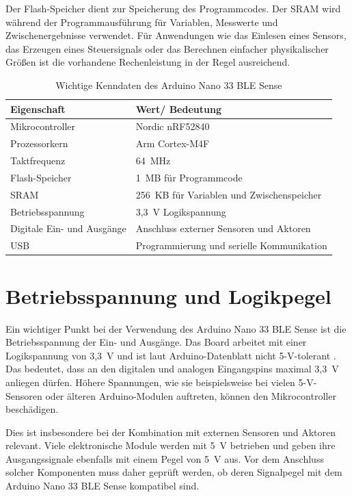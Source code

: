 Der Flash-Speicher dient zur Speicherung des Programmcodes. Der SRAM wird während der Programmausführung für Variablen, Messwerte und Zwischenergebnisse verwendet. Für Anwendungen wie das Einlesen eines Sensors, das Erzeugen eines Steuersignals oder das Berechnen einfacher physikalischer Grö\ss en ist die vorhandene Rechenleistung in der Regel ausreichend.

\begin{table}[h]
	\centering
	\begin{tabular}{ll}
		\textbf{Eigenschaft} & \textbf{Wert/ Bedeutung} \\
		\hline
		Mikrocontroller & Nordic nRF52840 \\
		Prozessorkern & Arm Cortex-M4F \\
		Taktfrequenz & 64~MHz \\
		Flash-Speicher & 1~MB für Programmcode \\
		SRAM & 256~KB für Variablen und Zwischenspeicher \\
		Betriebsspannung & 3,3~V Logikspannung \\
		Digitale Ein- und Ausgänge & Anschluss externer Sensoren und Aktoren \\
		USB & Programmierung und serielle Kommunikation \\
	\end{tabular}
	\caption{Wichtige Kenndaten des Arduino Nano 33 BLE Sense}
	\label{tab:arduinoKenndaten}
\end{table}

\section{Betriebsspannung und Logikpegel}

Ein wichtiger Punkt bei der Verwendung des Arduino Nano 33 BLE Sense ist die Betriebsspannung der Ein- und Ausgänge. Das Board arbeitet mit einer Logikspannung von 3,3~V und ist laut Arduino-Datenblatt nicht 5-V-tolerant \cite{ArduinoNano:2026}. Das bedeutet, dass an den digitalen und analogen Eingangspins maximal 3,3~V anliegen dürfen. Höhere Spannungen, wie sie beispielsweise bei vielen 5-V-Sensoren oder älteren Arduino-Modulen auftreten, können den Mikrocontroller beschädigen\cite{Bri:2026}.

Dies ist insbesondere bei der Kombination mit externen Sensoren und Aktoren relevant. Viele elektronische Module werden mit 5~V betrieben und geben ihre Ausgangssignale ebenfalls mit einem Pegel von 5~V aus. Vor dem Anschluss solcher Komponenten muss daher geprüft werden, ob deren Signalpegel mit dem Arduino Nano 33 BLE Sense kompatibel sind.

